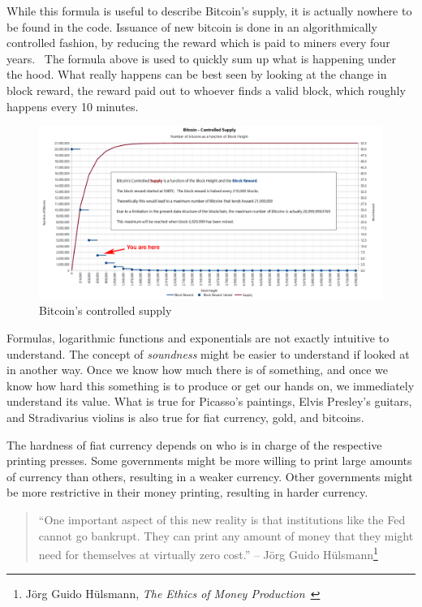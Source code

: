 While this formula is useful to describe Bitcoin's supply, it is actually
nowhere to be found in the code. Issuance of new bitcoin is done in an
algorithmically controlled fashion, by reducing the reward which is paid to
miners every four years.~\cite{btcwiki:supply} The formula above is used to
quickly sum up what is happening under the hood. What really happens can be best
seen by looking at the change in block reward, the reward paid out to whoever
finds a valid block, which roughly happens every 10 minutes.

\begin{figure}
  \includegraphics{assets/images/you-are-here.png}
  \caption{Bitcoin's controlled supply}
  \label{fig:you-are-here.png}
\end{figure}

Formulas, logarithmic functions and exponentials are not exactly
intuitive to understand. The concept of \textit{soundness} might be easier to
understand if looked at in another way. Once we know how much there is
of something, and once we know how hard this something is to produce or
get our hands on, we immediately understand its value. What is true for
Picasso's paintings, Elvis Presley's guitars, and Stradivarius violins
is also true for fiat currency, gold, and bitcoins.

The hardness of fiat currency depends on who is in charge of the
respective printing presses. Some governments might be more willing to
print large amounts of currency than others, resulting in a weaker
currency. Other governments might be more restrictive in their money
printing, resulting in harder currency.

\begin{samepage}
\begin{quotation}
\enquote{One important aspect of this new reality is that institutions like
the Fed cannot go bankrupt. They can print any amount of money that
they might need for themselves at virtually zero cost.}
\flushright -- Jörg Guido Hülsmann\footnote{Jörg Guido Hülsmann, \textit{The
Ethics of Money Production}~\cite{hulsmann2008ethics}}
\end{quotation}
\end{samepage}

